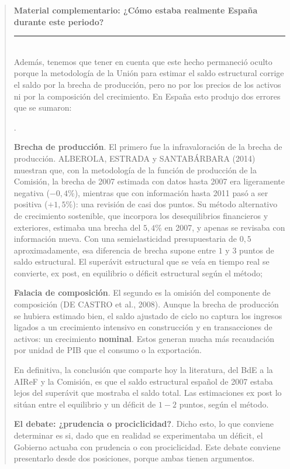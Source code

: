\documentclass[10pt,a4paper]{article}
\newcounter{numitem}
\newenvironment{lnum}
      {\begin{list}{\arabic{numitem}.}{%
          \usecounter{numitem}%
          \setlength{\leftmargin}{1cm}%
          \setlength{\parskip}{3pt}%
          \setlength{\itemsep}{0pt}%
          \setlength{\parsep}{0pt}%
      }}
      {\end{list}}
\newenvironment{specialblock}[1]{%
      \begin{quote} %
      \small %
      \noindent\textbf{#1}\\[-0.3em] %
      \rule{\linewidth}{0.4pt}\\[0.6em]}{
      \end{quote}}
\begin{document}
\begin{specialblock}{\textbf{Material complementario:} ¿Cómo estaba \textbf{realmente} España durante este periodo?}
    Además, tenemos que tener en cuenta que este hecho permaneció oculto porque la metodología de la Unión para estimar el saldo estructural corrige el saldo por la brecha de producción, pero no por los precios de los activos ni por la composición del crecimiento. En España esto produjo dos errores que se sumaron:
    \begin{lnum}
        \item \textbf{Brecha de producción}. El primero fue la infravaloración de la brecha de producción. ALBEROLA, ESTRADA y SANTABÁRBARA (2014) muestran que, con la metodología de la función de producción de la Comisión, la brecha de 2007 estimada con datos hasta 2007 era ligeramente negativa ($-0,4\%$), mientras que con información hasta 2011 pasó a ser positiva ($+1,5\%$): una revisión de casi dos puntos. Su método alternativo de crecimiento sostenible, que incorpora los desequilibrios financieros y exteriores, estimaba una brecha del $5,4\%$ en 2007, y apenas se revisaba con información nueva. Con una semielasticidad presupuestaria de $0,5$ aproximadamente, esa diferencia de brecha supone entre $1$ y $3$ puntos de saldo estructural. El superávit estructural que se veía en tiempo real se convierte, ex post, en equilibrio o déficit estructural según el método;
        \item \textbf{Falacia de composición}. El segundo es la omisión del componente de composición (DE CASTRO et al., 2008). Aunque la brecha de producción se hubiera estimado bien, el saldo ajustado de ciclo no captura los ingresos ligados a un crecimiento intensivo en construcción y en transacciones de activos: un crecimiento \textbf{nominal}. Estos generan mucha más recaudación por unidad de PIB que el consumo o la exportación. 
    \end{lnum}
    
    En definitiva, la conclusión que comparte hoy la literatura, del BdE a la AIReF y la Comisión, es que el saldo estructural español de 2007 estaba lejos del superávit que mostraba el saldo total. Las estimaciones ex post lo sitúan entre el equilibrio y un déficit de $1-2$ puntos, según el método.

    \textbf{El debate: ¿prudencia o prociclicidad?}. Dicho esto, lo que conviene determinar es si, dado que en realidad se experimentaba un déficit, el Gobierno actuaba con prudencia o con prociclicidad. Este debate conviene presentarlo desde dos posiciones, porque ambas tienen argumentos.
    

\end{specialblock}
\end{document}
